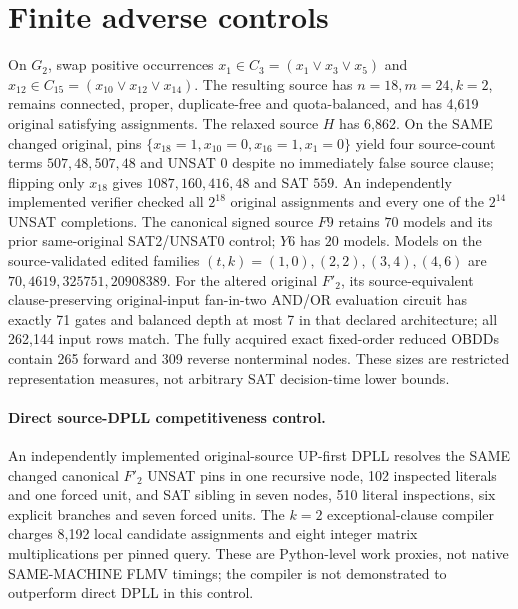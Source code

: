 \documentclass[11pt]{article}
\begin{document}
\section{Finite adverse controls}
On $G_2$, swap positive occurrences $x_1\in C_3=(x_1\vee x_3\vee x_5)$ and $x_{12}\in C_{15}=(x_{10}\vee x_{12}\vee x_{14})$. The resulting source has $n=18,m=24,k=2$, remains connected, proper, duplicate-free and quota-balanced, and has 4,619 original satisfying assignments. The relaxed source $H$ has 6,862. On the SAME changed original, pins $\{x_{18}=1,x_{10}=0,x_{16}=1,x_1=0\}$ yield four source-count terms $507,48,507,48$ and UNSAT $0$ despite no immediately false source clause; flipping only $x_{18}$ gives $1087,160,416,48$ and SAT $559$. An independently implemented verifier checked all $2^{18}$ original assignments and every one of the $2^{14}$ UNSAT completions. The canonical signed source $F9$ retains $70$ models and its prior same-original SAT2/UNSAT0 control; $Y6$ has $20$ models. Models on the source-validated edited families $(t,k)=(1,0),(2,2),(3,4),(4,6)$ are $70,4619,325751,20908389$.
For the altered original $F'_2$, its source-equivalent clause-preserving original-input fan-in-two AND/OR evaluation circuit has exactly 71 gates and balanced depth at most 7 in that declared architecture; all 262,144 input rows match. The fully acquired exact fixed-order reduced OBDDs contain 265 forward and 309 reverse nonterminal nodes. These sizes are restricted representation measures, not arbitrary SAT decision-time lower bounds.
\paragraph{Direct source-DPLL competitiveness control.}
An independently implemented original-source UP-first DPLL resolves the SAME changed
canonical $F'_2$ UNSAT pins in one recursive node, 102 inspected literals and
one forced unit, and SAT sibling in seven nodes, 510 literal inspections,
six explicit branches and seven forced units. The $k=2$ exceptional-clause
compiler charges 8,192 local candidate assignments and eight integer matrix
multiplications per pinned query. These are Python-level work proxies,
not native SAME-MACHINE FLMV timings; the compiler is not demonstrated
to outperform direct DPLL in this control.
\end{document}
